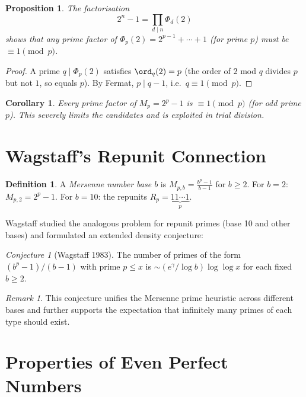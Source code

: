 \documentclass[12pt,a4paper]{amsart}
\newtheorem{corollary}[theorem]{Corollary}
\newtheorem{proposition}[theorem]{Proposition}
\theoremstyle{definition}
\newtheorem{definition}[theorem]{Definition}
\theoremstyle{remark}
\newtheorem{remark}[theorem]{Remark}
\newtheorem{conjecture}[theorem]{Conjecture}
\begin{document}
\begin{proposition}
The factorisation
\[
  2^n - 1 = \prod_{d \mid n} \Phi_d(2)
\]
shows that any prime factor of $\Phi_p(2) = 2^{p-1} + \cdots + 1$ (for prime $p$)
must be $\equiv 1 \pmod{p}$.
\end{proposition}

\begin{proof}
A prime $q \mid \Phi_p(2)$ satisfies $\ord_q(2) = p$ (the order of $2$ mod $q$
divides $p$ but not $1$, so equals $p$). By Fermat, $p \mid q-1$, i.e.\
$q \equiv 1 \pmod{p}$.
\end{proof}

\begin{corollary}
Every prime factor of $M_p = 2^p - 1$ is $\equiv 1 \pmod{p}$
(for odd prime $p$).
This severely limits the candidates and is exploited in trial division.
\end{corollary}

\section{Wagstaff's Repunit Connection}

\begin{definition}
A \emph{Mersenne number base $b$} is $M_{p,b} = \frac{b^p - 1}{b - 1}$
for $b \geq 2$.
For $b = 2$: $M_{p,2} = 2^p - 1$.
For $b = 10$: the repunits $R_p = \underbrace{11\cdots1}_p$.
\end{definition}

Wagstaff studied the analogous problem for repunit primes (base 10 and other
bases) and formulated an extended density conjecture:

\begin{conjecture}[Wagstaff 1983]
The number of primes of the form $(b^p - 1)/(b-1)$ with prime $p \leq x$
is $\sim (e^\gamma / \log b) \log\log x$ for each fixed $b \geq 2$.
\end{conjecture}

\begin{remark}
This conjecture unifies the Mersenne prime heuristic across different bases
and further supports the expectation that infinitely many primes of each type
should exist.
\end{remark}

\section{Properties of Even Perfect Numbers}
\end{document}
